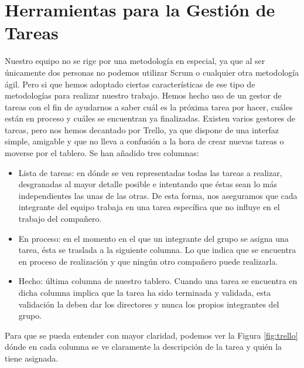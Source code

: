 \section{Herramientas para la Gestión de Tareas}
\label{cap:sec:herramientasGestionTareas}
Nuestro equipo no se rige por una metodología en especial, ya que al ser únicamente dos personas no podemos utilizar Scrum o cualquier otra metodología ágil. Pero si que hemos adoptado ciertas características de ese tipo de metodologías para realizar nuestro trabajo.
Hemos hecho uso de un gestor de tareas con el fin de ayudarnos a saber cuál es la próxima tarea por hacer, cuáles están en proceso y cuáles se encuentran ya finalizadas. Existen varios gestores de tareas, pero nos hemos decantado por Trello, ya que dispone de una interfaz simple, amigable y que no lleva a confusión a la hora de crear nuevas tareas o moverse por el tablero.
Se han añadido tres columnas:
\begin{itemize}
	\item Lista de tareas: en dónde se ven representadas todas las tareas a realizar, desgranadas al mayor detalle posible e intentando que éstas sean lo más independientes las unas de las otras. De esta forma, nos aseguramos que cada integrante del equipo trabaja en una tarea específica que no influye en el trabajo del compañero.
	\item En proceso: en el momento en el que un integrante del grupo se asigna una tarea, ésta se traslada a la siguiente columna. Lo que indica que se encuentra en proceso de realización y que ningún otro compañero puede realizarla. 
	\item Hecho: última columna de nuestro tablero. Cuando una tarea se encuentra en dicha columna implica que la tarea ha sido terminada y validada, esta validación la deben dar los directores y nunca los propios integrantes del grupo.
	
\end{itemize}

Para que se pueda entender con mayor claridad, podemos ver la Figura \ref{fig:trello} dónde en cada columna se ve claramente la descripción de la tarea y quién la tiene asignada.

